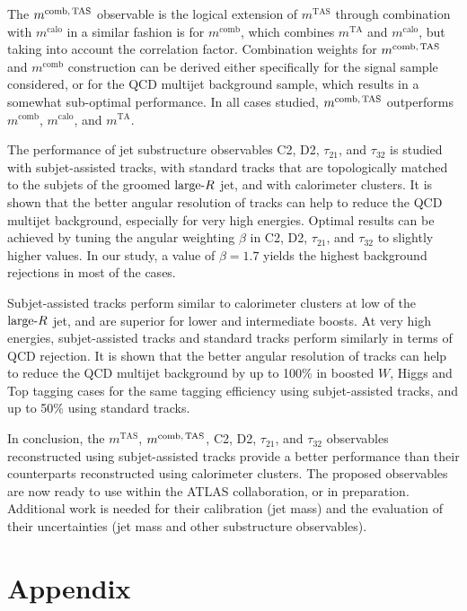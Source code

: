 \documentclass[UKenglish,texlive=2013]{\ATLASLATEXPATH atlasdoc}
\newcommand{\mta}{\ensuremath{m^\textrm{TA}}\xspace}
\newcommand{\mtas}{\ensuremath{m^\textrm{TAS}}\xspace}
\newcommand{\mcal}{\ensuremath{m^\textrm{calo}}\xspace}
\newcommand{\mcalo}{\ensuremath{m^\textrm{calo}}\xspace}
\newcommand{\mcomb}{\ensuremath{m^\textrm{comb}}\xspace}
\newcommand{\mcombtas}{\ensuremath{m^\textrm{comb,\,TAS}}\xspace}
\newcommand{\larger}{\ensuremath{\textrm{large}\hbox{-}R}\xspace}
\begin{document}
The $\mcombtas$ observable is the logical extension of $\mtas$ through combination with \mcalo in a similar fashion is for \mcomb, which combines \mta and \mcalo, but taking into account the correlation factor. Combination weights for \mcombtas and \mcomb construction can be derived either specifically for the signal sample considered, or for the QCD multijet background sample, which results in a somewhat sub-optimal performance. In all cases studied, \mcombtas outperforms $\mcomb$, $\mcal$, and $\mta$.


The performance of jet substructure observables C2, D2, $\tau_{21}$, and $\tau_{32}$ is studied with subjet-assisted tracks, with standard tracks that are topologically matched to the subjets of the groomed \larger jet, and with calorimeter clusters. It is shown that the better angular resolution of tracks can help to reduce the QCD multijet background, especially for very high energies. Optimal results can be achieved by tuning the angular weighting $\beta$ in  C2, D2, $\tau_{21}$, and $\tau_{32}$ to slightly higher values. In our study, a value of $\beta=1.7$ yields the highest background rejections in most of the cases.  


Subjet-assisted tracks perform similar to calorimeter clusters at low \pt of the \larger jet, and are superior for lower and intermediate boosts. At very high energies, subjet-assisted tracks and standard tracks perform similarly in terms of QCD rejection. It is shown that the better angular resolution of tracks can help to reduce the QCD multijet background by up to 100\% in boosted $W$, Higgs and Top tagging cases for the same tagging efficiency using subjet-assisted tracks, and up to 50\% using standard tracks.



In conclusion, the $\mtas$, $\mcombtas$, C2, D2, $\tau_{21}$, and $\tau_{32}$ observables reconstructed using subjet-assisted tracks provide a better performance than their counterparts reconstructed using calorimeter clusters. The proposed observables are now ready to use within the ATLAS collaboration, or in preparation. Additional work is needed for their calibration (jet mass) and the evaluation of their uncertainties (jet mass and other substructure observables).

\clearpage
\appendix
\part*{Appendix}
\end{document}
